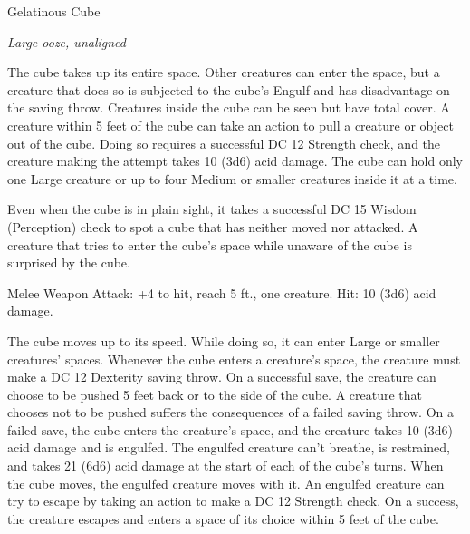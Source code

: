 \begin{monsterbox}{Gelatinous Cube}
\begin{hangingpar}
\textit{Large ooze, unaligned}
\end{hangingpar}
\dndline%
\basics[%
armorclass = 6,
hitpoints = 8d10 + 40,
speed = {15 ft.}
]
\dndline%
\stats[%
STR = \stat{14},
DEX = \stat{3},
CON = \stat{20},
INT = \stat{1},
WIS = \stat{6},
CHA = \stat{1}
]
\dndline%
\details[%
skills={},
damageimmunities={},
savingthrows={},
conditionimmunities={blinded, charmed, deafened, exhaustion, frightened, prone},
damageresistances={},
damagevulnerabilities={},
senses={blindsight 60 ft. (blind beyond this radius), passive Perception 8},
challenge=2
]
\dndline%
\begin{monsteraction}
The cube takes up its entire space. Other creatures can enter the space, but a creature that does so is subjected to the cube's Engulf and has disadvantage on the saving throw.
Creatures inside the cube can be seen but have total cover.
A creature within 5 feet of the cube can take an action to pull a creature or object out of the cube. Doing so requires a successful DC 12 Strength check, and the creature making the attempt takes 10 (3d6) acid damage.
The cube can hold only one Large creature or up to four Medium or smaller creatures inside it at a time.
\end{monsteraction}
\begin{monsteraction}[Transparent]
Even when the cube is in plain sight, it takes a successful DC 15 Wisdom (Perception) check to spot a cube that has neither moved nor attacked. A creature that tries to enter the cube's space while unaware of the cube is surprised by the cube.
\end{monsteraction}
\begin{monsteraction}[Pseudopod]
Melee Weapon Attack: +4 to hit, reach 5 ft., one creature. Hit: 10 (3d6) acid damage.
\end{monsteraction}
\begin{monsteraction}[Engulf]
The cube moves up to its speed. While doing so, it can enter Large or smaller creatures' spaces. Whenever the cube enters a creature's space, the creature must make a DC 12 Dexterity saving throw.
On a successful save, the creature can choose to be pushed 5 feet back or to the side of the cube. A creature that chooses not to be pushed suffers the consequences of a failed saving throw.
On a failed save, the cube enters the creature's space, and the creature takes 10 (3d6) acid damage and is engulfed. The engulfed creature can't breathe, is restrained, and takes 21 (6d6) acid damage at the start of each of the cube's turns. When the cube moves, the engulfed creature moves with it.
An engulfed creature can try to escape by taking an action to make a DC 12 Strength check. On a success, the creature escapes and enters a space of its choice within 5 feet of the cube.
\end{monsteraction}
\end{monsterbox}